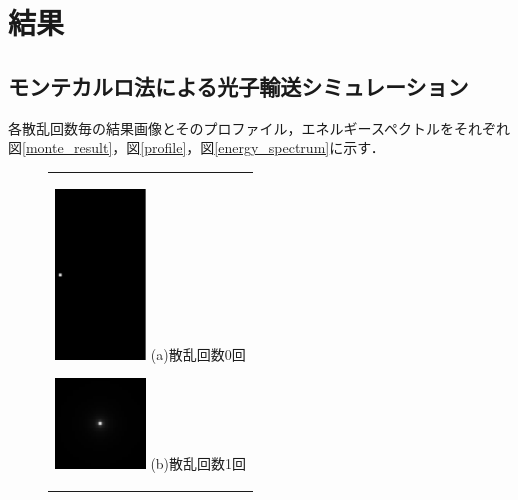 \documentclass[dvipdfmx,autodetect-engine,twocolumn,10pt]{jsarticle}%
\newif\iffigure
\begin{document}
\newpage
\section{結果}
\subsection{モンテカルロ法による光子輸送シミュレーション}
各散乱回数毎の結果画像とそのプロファイル，エネルギースペクトルをそれぞれ図\ref{monte_result}，図\ref{profile}，図\ref{energy_spectrum}に示す．
\iffigure

  \begin{figure}[htbp]
    \begin{center}
      \begin{tabular}{c}

        \begin{minipage}{0.33\hsize}
          \begin{center}
            \includegraphics[clip, width=2.4cm]{./file/monte_simu_primary.eps}
            \hspace{1cm} \small{(a)散乱回数0回} \vspace{0.2cm}
          \end{center}
        \end{minipage}

        \begin{minipage}{0.33\hsize}
          \begin{center}
            \includegraphics[clip, width=2.4cm]{./file/monte_simu_1.eps}
            \hspace{1.6cm} \small{(b)散乱回数1回} \vspace{0.2cm}
          \end{center}
        \end{minipage}


\end{tabular}
\end{center}
\end{figure}
\end{document}

